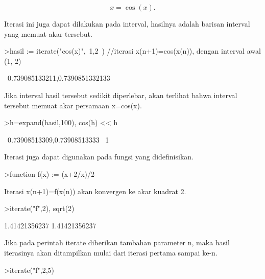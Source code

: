 \documentclass[a4paper,10pt]{article}
\begin{document}
\begin{eulernotebook}
\begin{eulercomment}
\begin{eulercomment}
\begin{eulercomment}
\begin{eulercomment}
\begin{eulercomment}
\begin{eulercomment}
\begin{eulercomment}
\end{eulercomment}
\begin{eulerformula}
\[
x = \cos(x).
\]
\end{eulerformula}
\begin{eulercomment}
Iterasi ini juga dapat dilakukan pada interval, hasilnya adalah barisan interval yang memuat
akar tersebut.
\end{eulercomment}
\begin{eulerprompt}
>hasil := iterate("cos(x)",~1,2~) //iterasi x(n+1)=cos(x(n)), dengan interval awal (1, 2)
\end{eulerprompt}
\begin{euleroutput}
  ~0.739085133211,0.7390851332133~
\end{euleroutput}
\begin{eulercomment}
Jika interval hasil tersebut sedikit diperlebar, akan terlihat bahwa interval tersebut
memuat akar persamaan x=cos(x).
\end{eulercomment}
\begin{eulerprompt}
>h=expand(hasil,100), cos(h) << h
\end{eulerprompt}
\begin{euleroutput}
  ~0.73908513309,0.73908513333~
  1
\end{euleroutput}
\begin{eulercomment}
Iterasi juga dapat digunakan pada fungsi yang didefinisikan.
\end{eulercomment}
\begin{eulerprompt}
>function f(x) := (x+2/x)/2
\end{eulerprompt}
\begin{eulercomment}
Iterasi x(n+1)=f(x(n)) akan konvergen ke akar kuadrat 2.
\end{eulercomment}
\begin{eulerprompt}
>iterate("f",2), sqrt(2)
\end{eulerprompt}
\begin{euleroutput}
  1.41421356237
  1.41421356237
\end{euleroutput}
\begin{eulercomment}
Jika pada perintah iterate diberikan tambahan parameter n, maka hasil iterasinya akan
ditampilkan mulai dari iterasi pertama sampai ke-n.
\end{eulercomment}
\begin{eulerprompt}
>iterate("f",2,5)
\end{eulerprompt}
\begin{euleroutput}
  [2,  1.5,  1.41667,  1.41422,  1.41421,  1.41421]

\end{euleroutput}
\end{eulercomment}
\end{eulercomment}
\end{eulercomment}
\end{eulercomment}
\end{eulercomment}
\end{eulercomment}
\end{eulernotebook}
\end{document}

